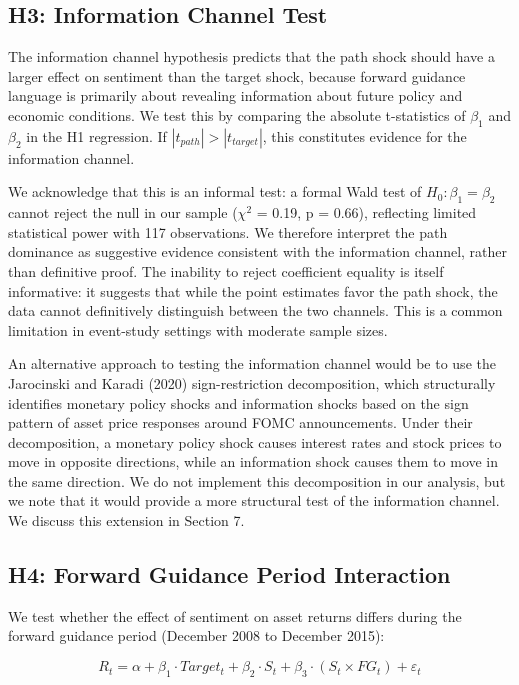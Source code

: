 \documentclass[12pt]{article}
\begin{document}
\subsection{H3: Information Channel Test}

The information channel hypothesis predicts that the path shock should have a larger effect on sentiment than the target shock, because forward guidance language is primarily about revealing information about future policy and economic conditions. We test this by comparing the absolute t-statistics of $\beta_1$ and $\beta_2$ in the H1 regression. If $|t_{path}| > |t_{target}|$, this constitutes evidence for the information channel.

We acknowledge that this is an informal test: a formal Wald test of $H_0: \beta_1 = \beta_2$ cannot reject the null in our sample ($\chi^2$ = 0.19, p = 0.66), reflecting limited statistical power with 117 observations. We therefore interpret the path dominance as suggestive evidence consistent with the information channel, rather than definitive proof. The inability to reject coefficient equality is itself informative: it suggests that while the point estimates favor the path shock, the data cannot definitively distinguish between the two channels. This is a common limitation in event-study settings with moderate sample sizes.

An alternative approach to testing the information channel would be to use the Jarocinski and Karadi (2020) sign-restriction decomposition, which structurally identifies monetary policy shocks and information shocks based on the sign pattern of asset price responses around FOMC announcements. Under their decomposition, a monetary policy shock causes interest rates and stock prices to move in opposite directions, while an information shock causes them to move in the same direction. We do not implement this decomposition in our analysis, but we note that it would provide a more structural test of the information channel. We discuss this extension in Section 7.

\subsection{H4: Forward Guidance Period Interaction}

We test whether the effect of sentiment on asset returns differs during the forward guidance period (December 2008 to December 2015):

\begin{equation*}
R_t = \alpha + \beta_1 \cdot Target_t + \beta_2 \cdot S_t + \beta_3 \cdot (S_t \times FG_t) + \varepsilon_t
\end{equation*}
\end{document}
